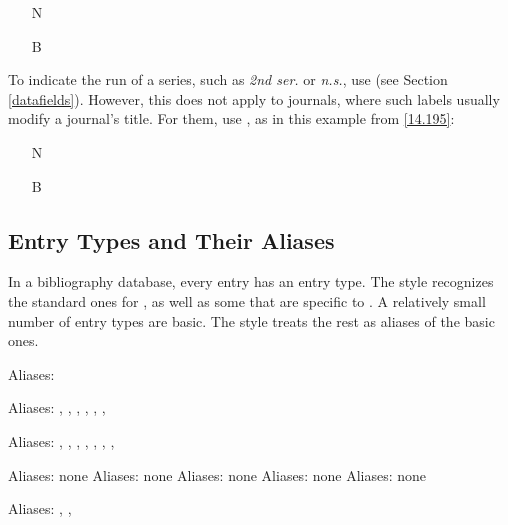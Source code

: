 \documentclass[11pt,letterpaper,oneside]{article}
\begin{document}
\begin{itemize}
\item[N] 

\item[B] 
\end{itemize}

To indicate the run of a series, such as \textit{2nd ser.} or
\textit{n.s.}, use  (see Section
\ref{datafields}). However, this does not apply to journals, where
such labels usually modify a journal's title. For them, use
, as in this example from \ref{14.195}:

\begin{itemize}
\item[N] 

\item[B] 
\end{itemize}

\subsection{Entry Types and Their Aliases}

In a bibliography database, every entry has an entry type. The style
recognizes the standard ones for \BibTeX, as well as some that are
specific to \biblatex. A relatively small number of entry types are
basic. The style treats the rest as aliases of the basic ones.

\begin{typelist}\raggedright


Aliases: 


Aliases: , , ,
, , ,


Aliases: , ,
, , ,
, , 

 Aliases: none
 Aliases: none
 Aliases: none
 Aliases: none
 Aliases: none


Aliases: , ,

\end{typelist}
\end{document}
